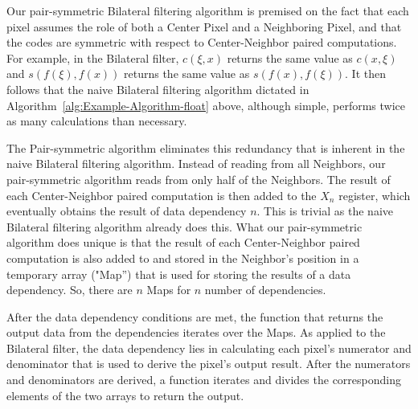 \documentclass{IEEEtran}
\begin{document}
Our pair-symmetric Bilateral filtering algorithm is premised on the fact that each pixel assumes the role of both a Center Pixel and a Neighboring Pixel, and that the codes are symmetric with respect to Center-Neighbor paired computations. For example, in the Bilateral filter, $c(\xi,x)$ returns the same value as $c(x,\xi)$ and $s(f(\xi),f(x))$ returns the same value as $s(f(x),f(\xi))$. It then follows that the naive Bilateral filtering algorithm dictated in Algorithm~\ref{alg:Example-Algorithm-float} above, although simple, performs twice as many calculations than necessary.

The Pair-symmetric algorithm eliminates this redundancy that is inherent in the naive Bilateral filtering algorithm. Instead of reading from all Neighbors, our pair-symmetric algorithm reads from only half of the Neighbors. The result of each Center-Neighbor paired computation is then added to the $X_n$ register, which eventually obtains the result of data dependency $n$. This is trivial as the naive Bilateral filtering algorithm already does this. What our pair-symmetric algorithm does unique is that the result of each Center-Neighbor paired computation is also added to and stored in the Neighbor's position in a temporary array ("Map'') that is used for storing the results of a data dependency. So, there are $n$ Maps for $n$ number of dependencies. 

After the data dependency conditions are met, the function that returns the output data from the dependencies iterates over the Maps. As applied to the Bilateral filter, the data dependency lies in calculating each pixel's numerator and denominator that is used to derive the pixel's output result. After the numerators and denominators are derived, a function iterates and divides the corresponding elements of the two arrays to return the output. 

\end{document}
